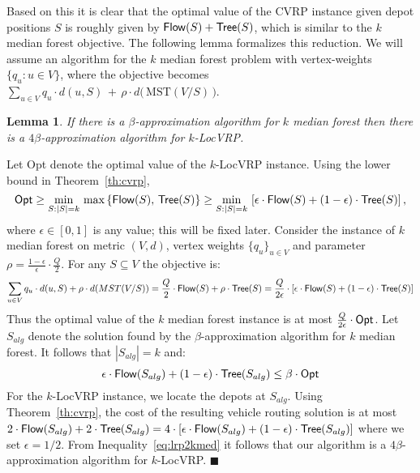 \documentclass[11pt,twoside,a4paper]{article}
\newtheorem{lemma}[theorem]{Lemma}
\newenvironment{proof}{

\noindent{\bf Proof:}} {\hfill$\blacksquare$


}
\newcommand{\sse}{\subseteq}
\def\lrp{$k$-LocVRP\xspace}
\def\opt{{\sf Opt}\xspace}
\def\kmf{$k$ median forest\xspace}
\begin{document}
Based on this it is clear that the optimal value of the CVRP instance given depot positions $S$ is roughly given by
${\sf Flow}(S)+{\sf Tree}(S)$, which is similar to the \kmf objective. The following lemma formalizes this reduction. We will
assume an algorithm for the $k$ median forest problem with vertex-weights $\{q_u:u\in V\}$, where the objective becomes
$\sum_{u\in V} q_u\cdot d(u,S) \, + \, \rho\cdot d\big(\,\mbox{MST}(V/S)\,\big)$.


\begin{lemma}\label{lem:lrp2kmed}
If there is a $\beta$-approximation algorithm for $k$ median forest then there is a $4\beta$-approximation algorithm
for \lrp.
\end{lemma}
\begin{proof} Let \opt denote the optimal value of the \lrp instance. Using the lower bound in Theorem~\ref{th:cvrp},
$$\opt \ge \min_{S:|S|=k} \, \max\left\{ \flow(S), \, \tree(S)\right\} \ge \min_{S:|S|=k} \, \left[\epsilon\cdot \flow(S) + (1-\epsilon)\cdot \tree(S)\right],$$
where $\epsilon\in [0,1]$ is any value; this will be fixed later. Consider the instance of $k$ median forest on metric
$(V,d)$, vertex weights $\{q_u\}_{u\in V}$ and parameter $\rho=\frac{1-\epsilon}\epsilon \cdot \frac{Q}2$. For any
$S\sse V$ the objective is:
$$\sum_{u\in V} q_u\cdot d(u,S) + \rho\cdot d(MST(V/S)) = \frac{Q}2 \cdot {\sf Flow}(S) + \rho\cdot {\sf Tree}(S) =
\frac{Q}{2\epsilon} \cdot \left[\epsilon\cdot {\sf Flow}(S) + (1-\epsilon)\cdot {\sf Tree}(S)\right] $$ Thus the optimal value of
the \kmf instance is at most $\frac{Q}{2\epsilon} \cdot \opt$. Let $S_{alg}$ denote the solution found by the
$\beta$-approximation algorithm for \kmf. It follows that $|S_{alg}|=k$ and:
\begin{equation} \label{eq:lrp2kmed}
\epsilon\cdot \flow(S_{alg}) + (1-\epsilon)\cdot \tree(S_{alg}) \le \beta\cdot \opt\end{equation} For the \lrp
instance, we locate the depots at $S_{alg}$. Using Theorem~\ref{th:cvrp}, the cost of the resulting vehicle routing
solution is at most $2\cdot {\sf Flow}(S_{alg}) + 2\cdot {\sf Tree}(S_{alg}) = 4\cdot \left[\epsilon\cdot {\sf Flow}(S_{alg}) +
(1-\epsilon)\cdot {\sf Tree}(S_{alg}) \right]$ where we set $\epsilon= 1/2$. From Inequality~\eqref{eq:lrp2kmed} it follows
that our algorithm is a $4\beta$-approximation algorithm for \lrp.
\end{proof}

\medskip
\end{document}
